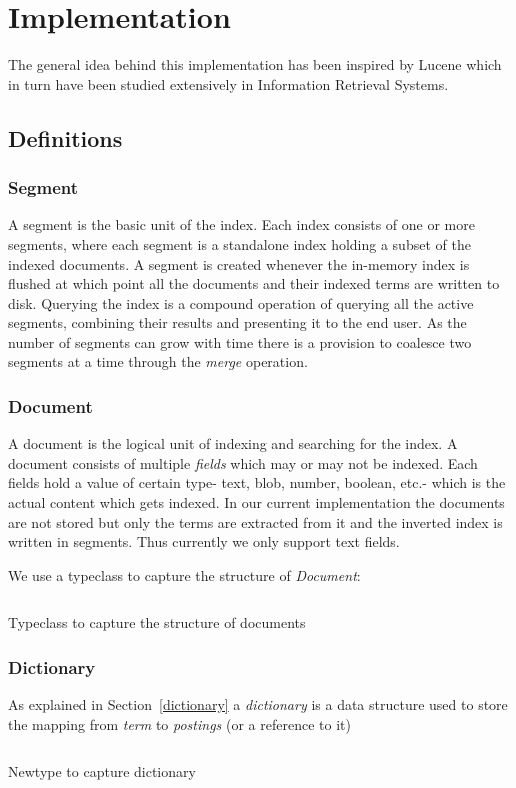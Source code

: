 \chapter{Implementation}
\label{chap:implementation}

The general idea behind this implementation has been inspired by Lucene\cite{goetz2000lucene}
which in turn have been studied extensively in Information Retrieval Systems.

\section{Definitions}

\subsection{Segment}
A segment is the basic unit of the index.
Each index consists of one or more segments, where each segment is a standalone index holding a subset of the indexed documents\cite{mccandless2010lucene}.
A segment is created whenever the in-memory index is flushed at which point all the documents and their indexed terms are written to disk.
Querying the index is a compound operation of querying all the active segments, combining their results and presenting it to the end user.
As the number of segments can grow with time there is a provision to coalesce two segments at a time through the \textit{merge} operation.

\subsection{Document}
A document is the logical unit of indexing and searching for the index.
A document consists of multiple \textit{fields} which may or may not be indexed.
Each fields hold a value of certain type- text, blob, number, boolean, etc.- which is the actual content which gets indexed.
In our current implementation the documents are not stored but only the terms are extracted from it and the inverted index is written in segments.
Thus currently we only support text fields.

We use a typeclass to capture the structure of \textit{Document}:
\begin{listing}
\inputminted{haskell}{hs/document.hs}
\caption{Typeclass to capture the structure of documents}
\end{listing}

\subsection{Dictionary}
As explained in Section~\ref{dictionary} a \textit{dictionary} is a data structure used to store the mapping from \textit{term} to \textit{postings} (or a reference to it)
\begin{listing}
\inputminted{haskell}{hs/dictionary.hs}
\caption{Newtype to capture dictionary}
\end{listing}

